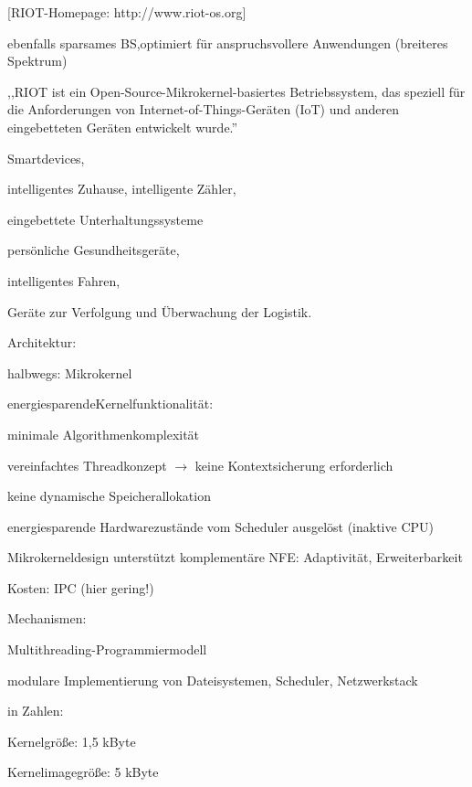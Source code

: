 \documentclass[a4paper]{article}
\begin{document}
\begin{multicols}{3}
    {[}RIOT-Homepage: http://www.riot-os.org{]}

    \begin{itemize*}
        \item
        ebenfalls sparsames BS,optimiert für anspruchsvollere Anwendungen
        (breiteres Spektrum)
        \item
        ,,RIOT ist ein Open-Source-Mikrokernel-basiertes Betriebssystem, das
        speziell für die Anforderungen von Internet-of-Things-Geräten (IoT)
        und anderen eingebetteten Geräten entwickelt wurde.''
        \begin{itemize*}
            \item Smartdevices,
            \item intelligentes Zuhause, intelligente Zähler,
            \item eingebettete Unterhaltungssysteme
            \item persönliche Gesundheitsgeräte,
            \item intelligentes Fahren,
            \item Geräte zur Verfolgung und Überwachung der Logistik.
        \end{itemize*}
        \item
        Architektur:
        \begin{itemize*}
            \item halbwegs: Mikrokernel
            \item energiesparendeKernelfunktionalität:
            \begin{itemize*}
                \item   minimale Algorithmenkomplexität
                \item   vereinfachtes Threadkonzept $\rightarrow$  keine   Kontextsicherung erforderlich
                \item   keine dynamische Speicherallokation
                \item   energiesparende Hardwarezustände vom Scheduler ausgelöst (inaktive CPU)
            \end{itemize*}
            \item Mikrokerneldesign unterstützt komplementäre NFE: Adaptivität, Erweiterbarkeit
            \item Kosten: IPC (hier gering!)
        \end{itemize*}
        \item
        Mechanismen:
        \begin{itemize*}
            \item Multithreading-Programmiermodell
            \item modulare Implementierung von Dateisystemen, Scheduler, Netzwerkstack
        \end{itemize*}
        \item
        in Zahlen:
        \begin{itemize*}
            \item Kernelgröße: 1,5 kByte
            \item Kernelimagegröße: 5 kByte
        \end{itemize*}
    \end{itemize*}


\end{multicols}
\end{document}
